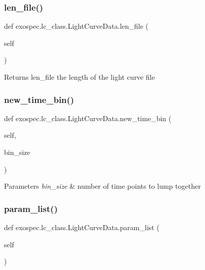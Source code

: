 \subsubsection{\texorpdfstring{len\+\_\+file()}{len\_file()}}
{\footnotesize\ttfamily def exospec.\+lc\+\_\+class.\+Light\+Curve\+Data.\+len\+\_\+file (\begin{DoxyParamCaption}\item[{}]{self }\end{DoxyParamCaption})}

\begin{DoxyReturn}{Returns}
len\+\_\+file the length of the light curve file 
\end{DoxyReturn}
\mbox{\label{classexospec_1_1lc__class_1_1_light_curve_data_ad09684789cb0431662a673f72aef7ac8}} 
\subsubsection{\texorpdfstring{new\+\_\+time\+\_\+bin()}{new\_time\_bin()}}
{\footnotesize\ttfamily def exospec.\+lc\+\_\+class.\+Light\+Curve\+Data.\+new\+\_\+time\+\_\+bin (\begin{DoxyParamCaption}\item[{}]{self,  }\item[{}]{bin\+\_\+size }\end{DoxyParamCaption})}


\begin{DoxyParams}{Parameters}
{\em bin\+\_\+size} & number of time points to lump together \\
\hline
\end{DoxyParams}
\mbox{\label{classexospec_1_1lc__class_1_1_light_curve_data_ab383d2dc1788a08a0336cb694f01c906}} 
\subsubsection{\texorpdfstring{param\+\_\+list()}{param\_list()}}
{\footnotesize\ttfamily def exospec.\+lc\+\_\+class.\+Light\+Curve\+Data.\+param\+\_\+list (\begin{DoxyParamCaption}\item[{}]{self }\end{DoxyParamCaption})}

